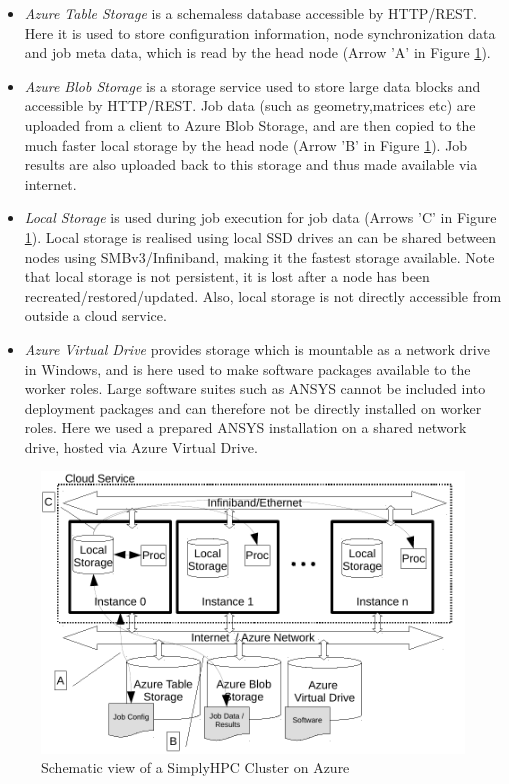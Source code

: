 \documentclass[3p,times]{elsarticle}
\begin{document}
\begin{itemize}


	\item \textit{Azure Table Storage} is a schemaless database accessible by HTTP/REST. Here it is used to store configuration information, node synchronization data and job meta data, which is read by the head node (Arrow 'A' in Figure \ref{fig:schemaService}).
	
	\item \textit{Azure Blob Storage} is a storage service used to store large data blocks and accessible by HTTP/REST. Job data (such as geometry,matrices etc) are uploaded from a client to Azure Blob Storage, and are then copied to the much faster local storage by the head node (Arrow 'B' in Figure \ref{fig:schemaService}). Job results are also uploaded back to this storage and thus made available via internet.	
	
	\item \textit{Local Storage} is used during job execution for job data (Arrows 'C' in Figure \ref{fig:schemaService}). Local storage is realised using local SSD drives an can be shared between nodes using SMBv3/Infiniband, making it the fastest storage available. Note that local storage is not persistent, it is lost after a node has been recreated/restored/updated. Also, local storage is not directly accessible from outside a cloud service.
	
	\item \textit{Azure Virtual Drive} provides storage which is mountable as a network drive in Windows, and is here used to make software packages available to the worker roles. Large software suites such as ANSYS cannot be included into deployment packages and can therefore not be directly installed on worker roles. Here we used a prepared ANSYS installation on a shared network drive, hosted via Azure Virtual Drive.
	

\end{itemize}


\begin{figure}[ht]
	\centering
	\includegraphics[width=.6\linewidth]{azureDeployment.pdf}

	\caption{Schematic view of a SimplyHPC Cluster on Azure}	
	\label{fig:schemaService}
\end{figure}
\end{document}
